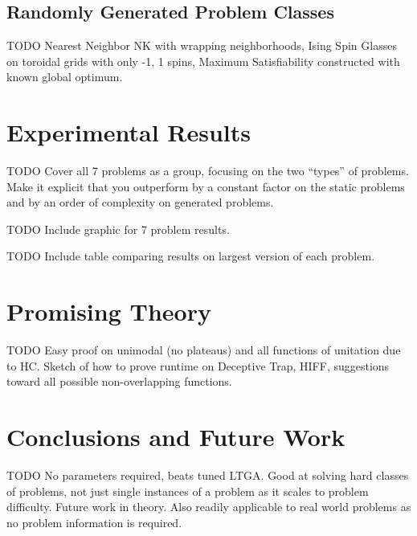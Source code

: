 \documentclass{sig-alternate}
\begin{document}
\subsection{Randomly Generated Problem Classes}
TODO Nearest Neighbor NK with wrapping neighborhoods, Ising Spin Glasses on toroidal
grids with only -1, 1 spins, Maximum Satisfiability constructed with known global
optimum.

\section{Experimental Results}
TODO Cover all 7 problems as a group, focusing on the two ``types'' of problems.
Make it explicit that you outperform by a constant factor on the static problems
and by an order of complexity on generated problems.

TODO Include graphic for 7 problem results.

TODO Include table comparing results on largest version of each problem.

\section{Promising Theory}
TODO Easy proof on unimodal (no plateaus) and all functions of unitation due to HC.
Sketch of how to prove runtime on Deceptive Trap, HIFF, suggestions toward all
possible non-overlapping functions.

\section{Conclusions and Future Work}
TODO No parameters required, beats tuned LTGA.  Good at solving hard classes
of problems, not just single instances of a problem as it scales to problem difficulty.
Future work in theory.  Also readily applicable to real world problems as no
problem information is required.

%

%
%
\balancecolumns
\end{document}
